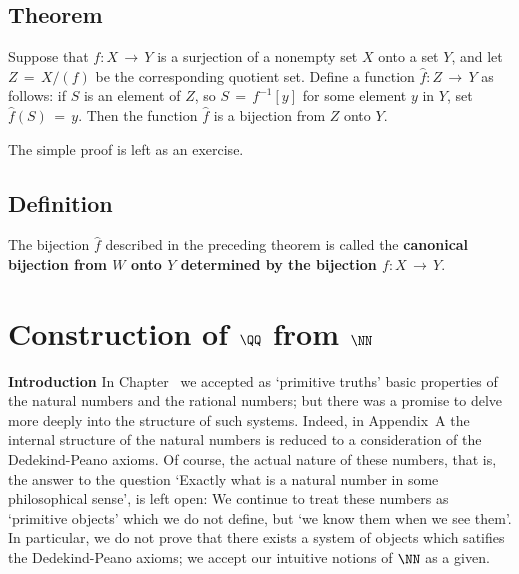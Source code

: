 \V
\V

        \subsection{\small{{\bf Theorem}}}
                \label{ThmA50.125}

        Suppose that $f:X \,{\rightarrow}\, Y$ is a surjection of a nonempty set $X$ onto a set $Y$,
    and let $Z \,=\, X/(f)$ be the corresponding quotient set.
    Define a function $\hat{f}:Z \,{\rightarrow}\, Y$ as follows: if $S$ is an element of $Z$, so $S \,=\, f^{-1}[y]$ for some element $y$ in $Y$, set $\hat{f}(S) \,=\, y$.
    Then the function $\hat{f}$ is a bijection from $Z$ onto $Y$.

\V

        The simple proof is left as an exercise.

\VV

        \subsection{\small{{\bf Definition}}}
                \label{DefA50.127}

        The bijection $\hat{f}$ described in the preceding theorem is called the {\bf canonical bijection from $W$ onto $Y$ determined by the bijection $f:X \,{\rightarrow}\, Y$}.

\VV

                        \section{Construction of ${\QQ}$ from ${\NN}$}
                        \label{SectAAdd3}%
\VV

        {\bf Introduction} In Chapter~ we accepted as `primitive truths' basic properties of the natural numbers and the rational numbers;
    but there was a promise to delve more deeply into the structure of such systems.
    Indeed, in Appendix~A the internal structure of the natural numbers is reduced to a consideration of the Dedekind-Peano axioms.
    Of course, the actual nature of these numbers, that is, the answer to the question
    `Exactly what is a natural number in some philosophical sense', is left open:
    We continue to treat these numbers as `primitive objects' which we do not define, but `we know them when we see them'. In particular,
    we do not prove that there exists a system of objects which satifies the Dedekind-Peano axioms; we accept our intuitive notions of ${\NN}$ as a given.

